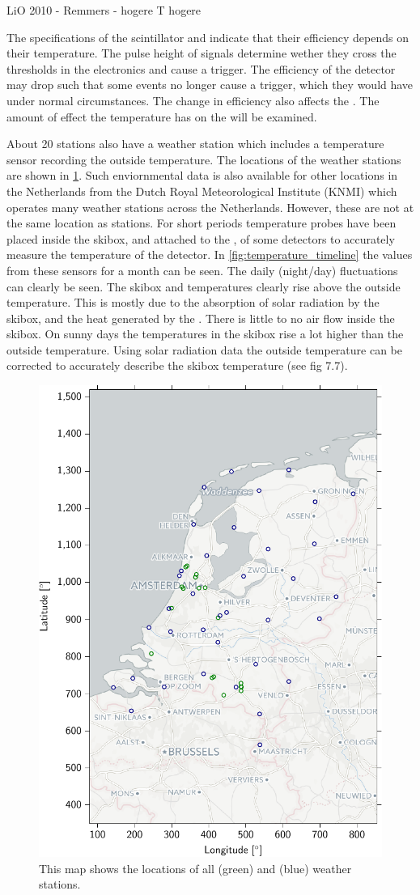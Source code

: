 LiO 2010 - Remmers - hogere T hogere \mpv

The specifications of the scintillator and \pmt indicate that their efficiency depends on their temperature. The pulse height of signals determine wether they cross the thresholds in the electronics and cause a trigger. The efficiency of the detector may drop such that some events no longer cause a trigger, which they would have under normal circumstances. The change in efficiency also affects the \mpv. The amount of effect the temperature has on the \mpv will be examined.

About 20 \hisparc stations also have a weather station which includes a temperature sensor recording the outside temperature. The locations of the weather stations are shown in \cref{fig:weather-map}. Such enviornmental data is also available for other locations in the Netherlands from the Dutch Royal Meteorological Institute (KNMI) which operates many weather stations across the Netherlands. However, these are not at the same location as \hisparc stations. For short periods temperature probes have been placed inside the skibox, and attached to the \pmt, of some detectors to accurately measure the temperature of the detector. In \cref{fig:temperature_timeline} the values from these sensors for a month can be seen. The daily (night/day) fluctuations can clearly be seen. The skibox and \pmt temperatures clearly rise above the outside temperature. This is mostly due to the absorption of solar radiation by the skibox, and the heat generated by the \pmt. There is little to no air flow inside the skibox. On sunny days the temperatures in the skibox rise a lot higher than the outside temperature. Using solar radiation data the outside temperature can be corrected to accurately describe the skibox temperature (see \cite{devries2012weather} fig 7.7).

\begin{figure}
    \centering
    \includegraphics[width=.6\linewidth]{plots/station/weather-map}
    \caption{This map shows the locations of all \hisparc (green) and \knmi (blue) weather stations.}
    \label{fig:weather-map}
\end{figure}

